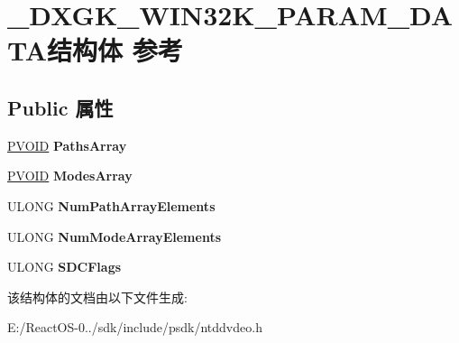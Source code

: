 \hypertarget{struct___d_x_g_k___w_i_n32_k___p_a_r_a_m___d_a_t_a}{}\section{\+\_\+\+D\+X\+G\+K\+\_\+\+W\+I\+N32\+K\+\_\+\+P\+A\+R\+A\+M\+\_\+\+D\+A\+T\+A结构体 参考}
\label{struct___d_x_g_k___w_i_n32_k___p_a_r_a_m___d_a_t_a}
\subsection*{Public 属性}
\begin{DoxyCompactItemize}
\item 
\mbox{\label{struct___d_x_g_k___w_i_n32_k___p_a_r_a_m___d_a_t_a_ae3c2d94be3dae39fd39260331d75c518}} 
\hyperlink{interfacevoid}{P\+V\+O\+ID} {\bfseries Paths\+Array}
\item 
\mbox{\label{struct___d_x_g_k___w_i_n32_k___p_a_r_a_m___d_a_t_a_a1a9b62849994c97d4068cc548b4abc48}} 
\hyperlink{interfacevoid}{P\+V\+O\+ID} {\bfseries Modes\+Array}
\item 
\mbox{\label{struct___d_x_g_k___w_i_n32_k___p_a_r_a_m___d_a_t_a_a96b23ed31b68d3b7260e7e78223bdcf3}} 
U\+L\+O\+NG {\bfseries Num\+Path\+Array\+Elements}
\item 
\mbox{\label{struct___d_x_g_k___w_i_n32_k___p_a_r_a_m___d_a_t_a_ae9a1fa4e091de272334fc561a0870d8c}} 
U\+L\+O\+NG {\bfseries Num\+Mode\+Array\+Elements}
\item 
\mbox{\label{struct___d_x_g_k___w_i_n32_k___p_a_r_a_m___d_a_t_a_a645774ee2889bac3ea18ec77d216527f}} 
U\+L\+O\+NG {\bfseries S\+D\+C\+Flags}
\end{DoxyCompactItemize}


该结构体的文档由以下文件生成\+:\begin{DoxyCompactItemize}
\item 
E\+:/\+React\+O\+S-\/0../sdk/include/psdk/ntddvdeo.\+h\end{DoxyCompactItemize}
